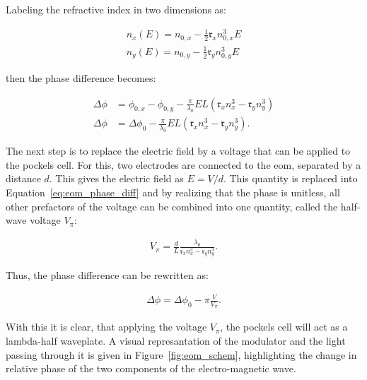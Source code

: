 Labeling the refractive index in two dimensions as:

\begin{align}
	n_x(E) = n_{0,x} - \frac{1}{2} \mathfrak{r}_x n_{0,x}^3 E \\
	n_y(E) = n_{0,y} - \frac{1}{2} \mathfrak{r}_y n_{0,y}^3 E
\end{align}

then the phase difference becomes:

\begin{align}
	\Delta \phi & = \phi_{0,x} - \phi_{0,y} - \frac{\pi}{\lambda_0} E L \left(\mathfrak{r}_x n_x^3 - \mathfrak{r}_y n_y^3\right) \\
	\Delta \phi & = \Delta \phi_{0} - \frac{\pi}{\lambda_0} E L \left(\mathfrak{r}_x n_x^3 - \mathfrak{r}_y n_y^3\right).
	\label{eq:eom_phase_diff}
\end{align}

\begin{figure}[t]
\end{figure}

The next step is to replace the electric field by a voltage that can be applied to the pockels cell. For this, two electrodes are connected to the \ac{eom}, separated by a distance $d$. This gives the electric field as $E=V/d$. This quantity is replaced into Equation~\ref{eq:eom_phase_diff} and by realizing that the phase is unitless, all other prefactors of the voltage can be combined into one quantity, called the half-wave voltage $V_\pi$:

\begin{align}
	V_\pi = \frac{d}{L} \frac{\lambda_0}{\mathfrak{r}_x n_x^3 - \mathfrak{r}_y n_y^3}.
\end{align}

Thus, the phase difference can be rewritten as:

\begin{align}
	\label{eq:eom_phase_diff}
	\Delta \phi = \Delta \phi_0 - \pi \frac{V}{V_\pi}.
\end{align}

With this it is clear, that applying the voltage $V_\pi$, the pockels cell will act as a lambda-half waveplate. A visual represantation of the modulator and the light passing through it is given in Figure~\ref{fig:eom_schem}, highlighting the change in relative phase of the two components of the electro-magnetic wave.


